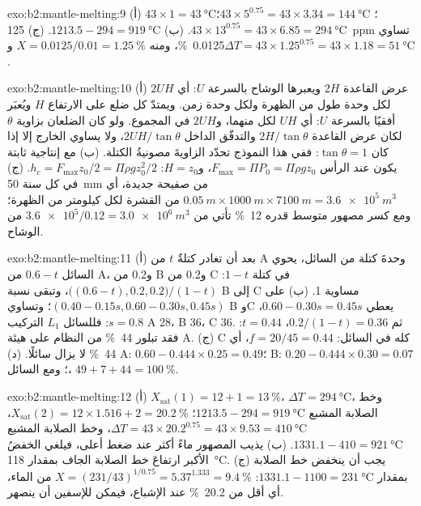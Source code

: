 \begin{solution}{exo:b2:mantle-melting:9}
(أ) $43\times1 = \qty{43}{\celsius}$؛ $43\times5^{0.75} = 43\times3.34 =
\qty{144}{\celsius}$؛ $43\times13^{0.75} = 43\times6.85 = \qty{294}{\celsius}$.
(ب) $1213.5 - 294 = \qty{919}{\celsius}$. (ج) \qty{125}{ppm} تساوي
\qty{0.0125}{\percent}، ومنه $X = 0.0125/0.01 = \qty{1.25}{\percent}$ و$\Delta T =
43\times1.25^{0.75} = 43\times1.18 = \qty{51}{\celsius}$.
\end{solution}

\begin{solution}{exo:b2:mantle-melting:10}
(أ) عرض القاعدة $2H$ ويعبرها الوشاح بالسرعة $U$: أي $2UH$ لكل وحدة طول
من الظهرة ولكل وحدة زمن. ويمتدّ كل ضلع على الارتفاع $H$ ويُعبَر أفقيًا بالسرعة
$U$: أي $UH$ لكل منهما، و$2UH$ في المجموع. ولو كان الضلعان بزاوية $\theta$ لكان عرض القاعدة
$2H/\tan\theta$ والتدفّق الداخل $2UH/\tan\theta$، ولا يساوي الخارج إلا إذا
كان $\tan\theta = 1$: ففي هذا النموذج تحدّد الزاويةَ مصونيةُ الكتلة. (ب) مع
إنتاجية ثابتة يكون  عند الرأس $F_{\max} = \Pi P_0 = \Pi\rho
g z_0$، و$H = z_0$: $h_c = F_{\max}z_0/2 = \Pi\rho g z_0^2/2$. (ج) في كل سنة
\qty{50}{mm} من صفيحة جديدة، أي $\qty{0.05}{m}\times\qty{1000}{m}\times\qty{7100}{m} =
\qty{3.6e5}{m^3}$ من القشرة لكل كيلومتر من الظهرة؛ ومع كسر مصهور متوسط قدره \qty{12}{\percent}
تأتي من $\num{3.6e5}/0.12 = \qty{3.0e6}{m^3}$ من الوشاح.
\end{solution}

\begin{solution}{exo:b2:mantle-melting:11}
(أ) بعد أن تغادر كتلةٌ $t$ من A وحدةَ كتلة من السائل، يحوي السائل $0.6 -
t$ من A، و0.2 من B و0.2 من C في كتلة $1 - t$: $\big((0.6 - t), 0.2,
0.2\big)/(1 - t)$، وتبقى نسبة B إلى C مساوية 1. (ب) على  $(0.40 - 0.15s, 0.60 -
0.30s, 0.45s)$؛ وتساوي B وC يعطي $0.60 - 0.30s = 0.45s$، $s = 0.8$: فللسائل $L_1$ التركيب A 28، B
36، C 36. ثم $0.2/(1 - t) = 0.36$، $t = 0.44$: فقد تبلور \qty{44}{\percent} من النظام
على هيئة A. (ج) C كله في السائل: $f = 20/45 = 0.44$، أي
\qty{44}{\percent} لا يزال سائلًا. (د) A: $0.60 - 0.444\times0.25 = 0.49$؛ B: $0.20 -
0.444\times0.30 = 0.07$؛ ومع السائل، $49 + 7 + 44 = \qty{100}{\percent}$.
\end{solution}

\begin{solution}{exo:b2:mantle-melting:12}
(أ) $X_{\mathrm{sat}}(1) = 12 + 1 = \qty{13}{\percent}$، $\Delta T =
\qty{294}{\celsius}$، وخط الصلابة المشبع $1213.5 - 294 = \qty{919}{\celsius}$؛
$X_{\mathrm{sat}}(2) = 12\times1.516 + 2 = \qty{20.2}{\percent}$، $\Delta T =
43\times20.2^{0.75} = 43\times9.53 = \qty{410}{\celsius}$، وخط الصلابة المشبع $1331.1
- 410 = \qty{921}{\celsius}$. (ب) يذيب المصهور ماءً أكثر عند ضغط أعلى،
فيلغي الخفضُ الأكبر ارتفاعَ خط الصلابة الجاف بمقدار \qty{118}{\celsius}.
(ج) يجب أن ينخفض خط الصلابة بمقدار $1331.1 - 1100 = \qty{231}{\celsius}$: $X =
(231/43)^{1/0.75} = 5.37^{1.333} = \qty{9.4}{\percent}$ من الماء، أي أقل من
\qty{20.2}{\percent} عند الإشباع، فيمكن للإسفين أن ينصهر.
\end{solution}

